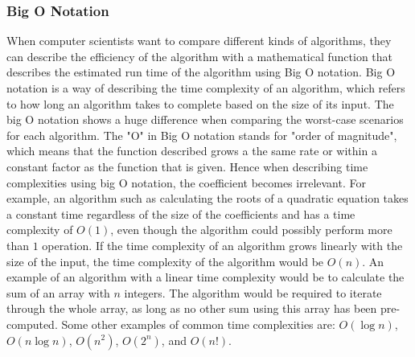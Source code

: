 \documentclass{article}
\begin{document}
\subsubsection{Big O Notation}\label{Big O}
When computer scientists want to compare different kinds of algorithms, they can describe the efficiency of the algorithm with a mathematical function that describes the estimated run time of the algorithm using Big O notation. Big O notation is a way of describing the time complexity of an algorithm, which refers to how long an algorithm takes to complete based on the size of its input. The big O notation shows a huge difference when comparing the worst-case scenarios for each algorithm.
\newline
The "O" in Big O notation stands for "order of magnitude", which means that the function described grows a the same rate or within a constant factor as the function that is given. Hence when describing time complexities using big O notation, the coefficient becomes irrelevant. For example, an algorithm such as calculating the roots of a quadratic equation takes a constant time regardless of the size of the coefficients and has a time complexity of $O(1)$, even though the algorithm could possibly perform more than $1$ operation. If the time complexity of an algorithm grows linearly with the size of the input, the time complexity of the algorithm would be $O(n)$. An example of an algorithm with a linear time complexity would be to calculate the sum of an array with $n$ integers. The algorithm would be required to iterate through the whole array, as long as no other sum using this array has been pre-computed. Some other examples of common time complexities are: $O(\log{n})$, $O(n \log{n})$, $O(n^2)$, $O(2^n)$, and $O(n!)$.


\newline
\end{document}
